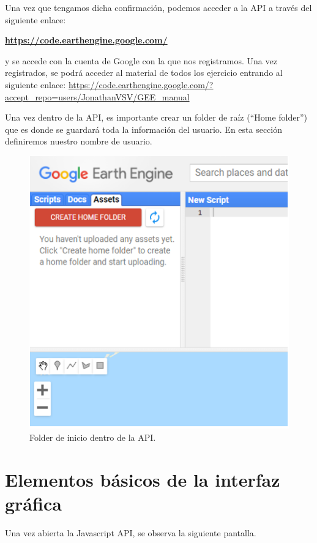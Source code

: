 \documentclass[
  12pt,
  letterpaper,
  twoside]{book}
\begin{document}
Una vez que tengamos dicha confirmación, podemos acceder a la API a través del siguiente enlace:

\textbf{\url{https://code.earthengine.google.com/}}

y se accede con la cuenta de Google con la que nos registramos.
Una vez registrados, se podrá acceder al material de todos los ejercicio entrando al siguiente enlace: \url{https://code.earthengine.google.com/?accept_repo=users/JonathanVSV/GEE_manual}

Una vez dentro de la API, es importante crear un folder de raíz (``Home folder'') que es donde se guardará toda la información del usuario. En esta sección definiremos nuestro nombre de usuario.

\begin{figure}

{\centering \includegraphics[width=0.6\linewidth]{Img/homeFolder} 

}

\caption{Folder de inicio dentro de la API.}\label{fig:unnamed-chunk-5}
\end{figure}

\hypertarget{elementos-buxe1sicos-de-la-interfaz-gruxe1fica}{%
\section{Elementos básicos de la interfaz gráfica}\label{elementos-buxe1sicos-de-la-interfaz-gruxe1fica}}

Una vez abierta la Javascript API, se observa la siguiente pantalla.
\end{document}

